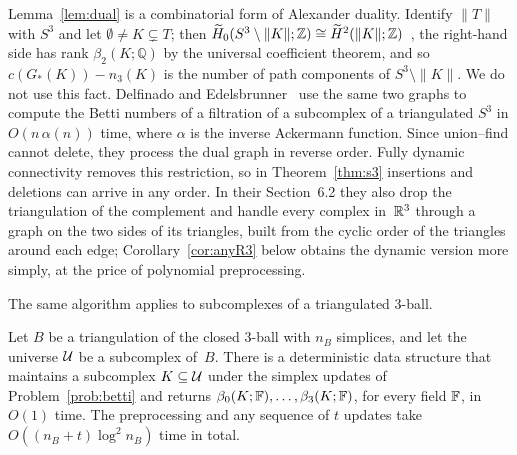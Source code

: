 Lemma~\ref{lem:dual} is a combinatorial form of Alexander duality.
Identify $\lVert T\rVert$ with $S^3$ and let $\emptyset\ne K\subsetneq T$; then $\widetilde H_0(S^3\setminus\lVert K\rVert;\mathbb{Z})\cong\widetilde H^2(\lVert K\rVert;\mathbb{Z})$~\cite[Section~3.3]{Hat02}, the right-hand side has rank $\beta_2(K;\mathbb{Q})$ by the universal coefficient theorem, and so $c(G_\ast(K))-n_3(K)$ is the number of path components of $S^3\setminus\lVert K\rVert$.
We do not use this fact.
Delfinado and Edelsbrunner~\cite{DE95} use the same two graphs to compute the Betti numbers of a filtration of a subcomplex of a triangulated $S^3$ in $O(n\,\alpha(n))$ time, where $\alpha$ is the inverse Ackermann function.
Since union--find cannot delete, they process the dual graph in reverse order.
Fully dynamic connectivity removes this restriction, so in Theorem~\ref{thm:s3} insertions and deletions can arrive in any order.
In their Section~6.2 they also drop the triangulation of the complement and handle every complex in~$\mathbb{R}^3$ through a graph on the two sides of its triangles, built from the cyclic order of the triangles around each edge; Corollary~\ref{cor:anyR3} below obtains the dynamic version more simply, at the price of polynomial preprocessing.

The same algorithm applies to subcomplexes of a triangulated $3$-ball.

\begin{corollary}\label{cor:r3}
Let $B$ be a triangulation of the closed $3$-ball with $n_B$ simplices, and let the universe $\mathcal{U}$ be a subcomplex of~$B$.
There is a deterministic data structure that maintains a subcomplex $K\subseteq\mathcal{U}$ under the simplex updates of Problem~\ref{prob:betti} and returns $\beta_0(K;\mathbb{F}),\dots,\beta_3(K;\mathbb{F})$, for every field $\mathbb{F}$, in $O(1)$ time.
The preprocessing and any sequence of $t$ updates take $O((n_B+t)\log^2n_B)$ time in total.
\end{corollary}

